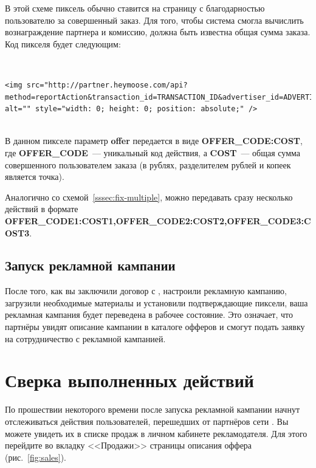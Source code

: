 \documentclass[a4paper,12pt]{article}
\begin{document}
В этой схеме пиксель обычно ставится на страницу с благодарностью пользователю за совершенный заказ. Для того, чтобы система \heymoose{} смогла вычислить вознаграждение партнера и комиссию, должна быть известна общая сумма заказа. Код пикселя будет следующим:

~\\

\begin{samepage}
\begin{lstlisting}[language=Pixel]
<img src="http://partner.heymoose.com/api?method=reportAction&transaction_id=TRANSACTION_ID&advertiser_id=ADVERTISER_ID&offer=OFFER_CODE:COST" 
alt="" style="width: 0; height: 0; position: absolute;" />
\end{lstlisting}
\end{samepage}

~\\

В данном пикселе параметр \textbf{offer} передается в виде \textbf{OFFER\_CODE:COST}, где \textbf{OFFER\_CODE}~--- уникальный код действия, а \textbf{COST}~--- общая сумма совершенного пользователем заказа (в рублях, разделителем рублей и копеек является точка).

Аналогично со схемой~\ref{sssec:fix-multiple}, можно передавать сразу несколько действий в формате \textbf{OFFER\_CODE1:COST1,OFFER\_CODE2:COST2,OFFER\_CODE3:COST3}.

\subsection{Запуск рекламной кампании}

После того, как вы заключили договор с \heymoose{}, настроили рекламную кампанию, загрузили необходимые материалы и установили подтверждающие пиксели, ваша рекламная кампания будет переведена в рабочее состояние. Это означает, что партнёры увидят описание кампании в каталоге офферов и смогут подать заявку на сотрудничество с рекламной кампанией.


\section{Сверка выполненных действий}

По прошествии некоторого времени после запуска рекламной кампании начнут отслеживаться действия пользователей, перешедших от партнёров сети \heymoose{}. Вы можете увидеть их в списке продаж в личном кабинете рекламодателя. Для этого перейдите во вкладку <<Продажи>> страницы описания оффера (рис.~\ref{fig:sales}).
\end{document}
